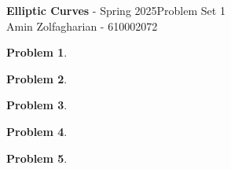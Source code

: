 \documentclass[12pt]{article}
\newcommand{\customanswer}[1]{%
\begin{problem}
\end{problem}

}
\newtheorem{problem}{Problem}
\begin{document}
\noindent \textbf{Elliptic Curves} - Spring 2025\hfill Problem Set 1\\
Amin Zolfagharian - 610002072

\hrulefill

\customanswer{1}
\customanswer{2}
\customanswer{3}
\newpage
\customanswer{4}
\customanswer{5}
\end{document}
